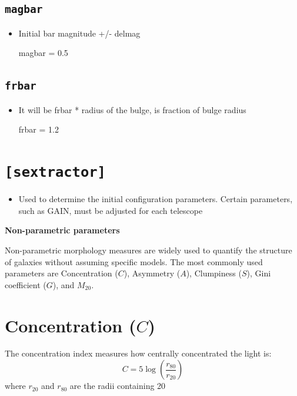 \documentclass[11pt]{article}
\begin{document}
\subsection{\texttt{magbar}}
\begin{itemize}
\item Initial bar magnitude +/- delmag

magbar = 0.5
\end{itemize}


\subsection{\texttt{frbar}}
\begin{itemize}
\item It will be frbar * radius of the bulge, is fraction of bulge radius

frbar = 1.2
\end{itemize}


\section{\texttt{[sextractor]}}
\begin{itemize}
\item Used to determine the initial configuration parameters. Certain parameters, such as GAIN, must be adjusted for each telescope
\end{itemize}

\newpage

\begin{center}
    {\huge \textbf{Non-parametric parameters}}
\end{center}

\setcounter{section}{0}
Non-parametric morphology measures are widely used to quantify the structure of galaxies without assuming specific models. The most commonly used parameters are Concentration ($C$), Asymmetry ($A$), Clumpiness ($S$), Gini coefficient ($G$), and $M_{20}$.

\section{Concentration ($C$)}
The concentration index measures how centrally concentrated the light is:
\begin{equation}
C = 5 \log \left( \frac{r_{80}}{r_{20}} \right)
\end{equation}
where $r_{20}$ and $r_{80}$ are the radii containing 20%
\end{document}
